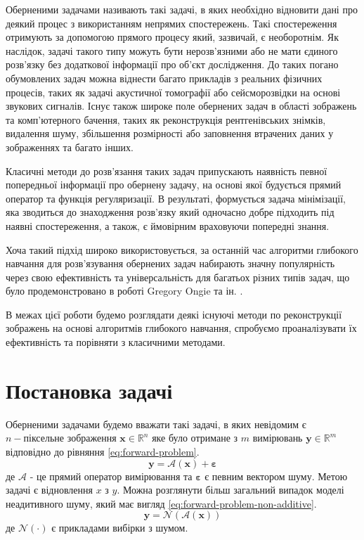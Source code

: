 \documentclass[14pt,a4paper]{extarticle}
\newcounter{e}
\numberwithin{equation}{section}
\numberwithin{figure}{section}
\begin{document}
	Оберненими задачами називають такі задачі, в яких необхідно відновити дані про деякий процес з використанням непрямих спостережень. Такі спостереження отримують за допомогою прямого процесу який, зазвичай, є необоротнім. Як наслідок, задачі такого типу можуть бути нерозв'язними або не мати єдиного розв'язку без додаткової інформації про об'єкт дослідження. До таких погано обумовлених задач можна віднести багато прикладів з реальних фізичних процесів, таких як задачі акустичної томографії або сейсморозвідки на основі звукових сигналів. Існує також широке поле обернених задач в області зображень та комп'ютерного бачення, таких як реконструкція рентгенівських знімків, видалення шуму, збільшення розмірності або заповнення втрачених даних у зображеннях та багато інших. 

	Класичні методи до розв'язання таких задач припускають наявність певної попередньої інформації про обернену задачу, на основі якої будується прямий оператор та функція регуляризації. В результаті, формується задача мінімізації, яка зводиться до знаходження розв'язку який одночасно добре підходить під наявні спостереження, а також, є ймовірним враховуючи попередні знання.
	
	Хоча такий підхід широко використовується, за останній час алгоритми глибокого навчання для розв'язування обернених задач набирають значну популярність через свою ефективність та універсальність для багатьох різних типів задач, що було продемонстровано в роботі Gregory Ongie та ін. \cite{ongie2020deep}. 
	
	В межах цієї роботи будемо розглядати деякі існуючі методи по реконструкції зображень на основі алгоритмів глибокого навчання, спробуємо проаналізувати їх ефективність та порівняти з класичними методами.
	
	\newpage
	\thispagestyle{empty}
	\section{Постановка задачі}
		
	Оберненими задачами будемо вважати такі задачі, в яких невідомим є $n-\text{піксельне}$ зображення $\boldsymbol{x} \in \mathbb{R}^{n}$ яке було отримане з $m$ вимірювань $\boldsymbol{y} \in \mathbb{R}^{m}$ відповідно до рівняння \ref{eq:forward-problem}.
	\begin{equation}
	\label{eq:forward-problem}
	\boldsymbol{y}=\mathcal{A}\left(\boldsymbol{x}\right)+\boldsymbol{\varepsilon}
	\end{equation}
	де $\mathcal{A}$ - це прямий оператор вимірювання та $\boldsymbol{\varepsilon}$ є певним вектором шуму. Метою задачі є відновлення $x$ з $y$. Можна розглянути більш загальний випадок моделі неадитивного шуму, який має вигляд \ref{eq:forward-problem-non-additive}.
	\begin{equation}
	\label{eq:forward-problem-non-additive}
	\boldsymbol{y}=\mathcal{N}\left(\mathcal{A}\left(\boldsymbol{x}\right)\right)
	\end{equation}
	де $\mathcal{N}(\cdot)$ є прикладами вибірки з шумом.
\end{document}
